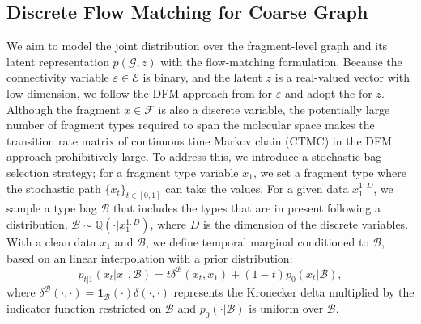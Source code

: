 \subsection{Discrete Flow Matching for Coarse Graph} 
\label{sec:discrete_flow_matching_for_coarse_graph}




We aim to model the joint distribution over the fragment-level graph and its latent representation $p(\mathcal{G}, z)$ with the flow-matching formulation. 
Because the connectivity variable $\varepsilon\in \mathcal{E}$ is binary, and the latent $z$ is a real-valued vector with low dimension, we follow the DFM approach from \citet{dfm_1} for $\varepsilon$ and adopt the \citet{cfm} for $z$. 
Although the fragment $x\in\mathcal{F}$ is also a discrete variable, the potentially large number of fragment types required to span the molecular space makes the transition rate matrix of continuous time Markov chain (CTMC) in the DFM approach prohibitively large. 
To address this, we introduce a stochastic bag selection strategy; for a fragment type variable $x_1$, we set a fragment type where the stochastic path $\{x_t\}_{t\in[0,1]}$ can take the values.
For a given data $x_1^{1:D}$, we sample a type bag $\mathcal{B}$ that includes the types that are in present following a distribution, $\mathcal{B} \sim \mathbb{Q}(\cdot | x_1^{1:D})$, where $D$ is the dimension of the discrete variables.
With a clean data $x_1$ and $\mathcal{B}$, we define temporal marginal conditioned to $\mathcal{B}$, based on an linear interpolation with a prior distribution: 
\begin{equation}
    p_{t|1}(x_t | x_1, \mathcal{B}) = t \delta ^ {\mathcal{B}}(x_t, x_1) + (1 - t) p_{0}(x_t | \mathcal{B}),
    \label{eq:define_prob_interpolation}
\end{equation}
where $\delta^{\mathcal{B}}(\cdot, \cdot)=\mathbf{1}_{\mathcal{B}}(\cdot)\delta(\cdot, \cdot)$ represents the Kronecker delta multiplied by the indicator function restricted on $\mathcal{B}$ and $p_0(\cdot|\mathcal{B})$ is uniform over $\mathcal{B}$. 

